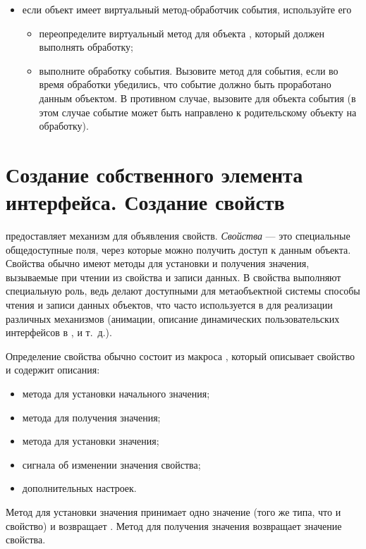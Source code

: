 \begin{itemize}
\item если объект имеет виртуальный метод-обработчик события, используйте его
 \begin{itemize}
 \item переопределите виртуальный метод для объекта , который должен выполнять обработку;
 \item выполните обработку события. Вызовите метод  для события, если во время обработки
 убедились, что событие должно быть проработано данным объектом. В противном случае, вызовите 
 для объекта события (в этом случае событие может быть направлено к родительскому объекту на обработку).
 \end{itemize}
\end{itemize}

\section[Создание собственного элемента интерфейса]{Создание собственного элемента интерфейса. Создание свойств}
 предоставляет механизм для объявления свойств.
\emph{Свойства} --- это специальные общедоступные поля, через которые
можно получить доступ к данным объекта. Свойства обычно имеют методы для установки и получения значения, вызываемые при
чтении из свойства и записи данных. В  свойства выполняют специальную роль, 
ведь делают доступными для метаобъектной
системы способы чтения и записи данных объектов, что часто используется в  для реализации различных механизмов
(анимации, описание динамических пользовательских интерфейсов в , и т.~д.).

Определение свойства обычно состоит из макроса , который описывает свойство и содержит описания:
\begin{itemize}
\item метода для установки начального значения;
\item метода для получения значения;
\item метода для установки значения;
\item сигнала об изменении значения свойства;
\item дополнительных настроек.
\end{itemize}

Метод для установки значения принимает одно значение (того же типа, что и свойство) и возвращает .
Метод для получения значения возвращает значение свойства.

